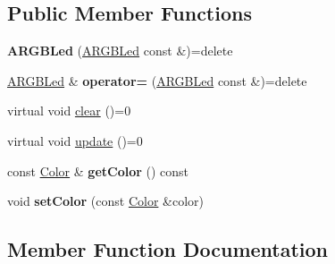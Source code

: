 \subsection*{Public Member Functions}
\begin{DoxyCompactItemize}
\item 
\mbox{\label{classwood_box_1_1display_1_1_a_r_g_b_led_a9d09c3d236e0ff522f1c4057aee6e3a9}} 
{\bfseries A\+R\+G\+B\+Led} (\mbox{\hyperlink{classwood_box_1_1display_1_1_a_r_g_b_led}{A\+R\+G\+B\+Led}} const \&)=delete
\item 
\mbox{\label{classwood_box_1_1display_1_1_a_r_g_b_led_acbc8bea5a3b1fe292d3ac37ab647d21b}} 
\mbox{\hyperlink{classwood_box_1_1display_1_1_a_r_g_b_led}{A\+R\+G\+B\+Led}} \& {\bfseries operator=} (\mbox{\hyperlink{classwood_box_1_1display_1_1_a_r_g_b_led}{A\+R\+G\+B\+Led}} const \&)=delete
\item 
virtual void \mbox{\hyperlink{classwood_box_1_1display_1_1_a_r_g_b_led_a01eeaee1bbb439e81f5f9bc536c04df7}{clear}} ()=0
\item 
virtual void \mbox{\hyperlink{classwood_box_1_1display_1_1_a_r_g_b_led_ab71f321d91e931f95b96d1f492a9454d}{update}} ()=0
\item 
\mbox{\label{classwood_box_1_1display_1_1_a_r_g_b_led_ae0bd01eab303006612eb46058824b0c1}} 
const \mbox{\hyperlink{structwood_box_1_1display_1_1_a_r_g_b_led_1_1_color}{Color}} \& {\bfseries get\+Color} () const
\item 
\mbox{\label{classwood_box_1_1display_1_1_a_r_g_b_led_ac06b3ee90d2f49785173e9142df47bb7}} 
void {\bfseries set\+Color} (const \mbox{\hyperlink{structwood_box_1_1display_1_1_a_r_g_b_led_1_1_color}{Color}} \&color)
\end{DoxyCompactItemize}


\subsection{Member Function Documentation}
\mbox{\label{classwood_box_1_1display_1_1_a_r_g_b_led_a01eeaee1bbb439e81f5f9bc536c04df7}} 
